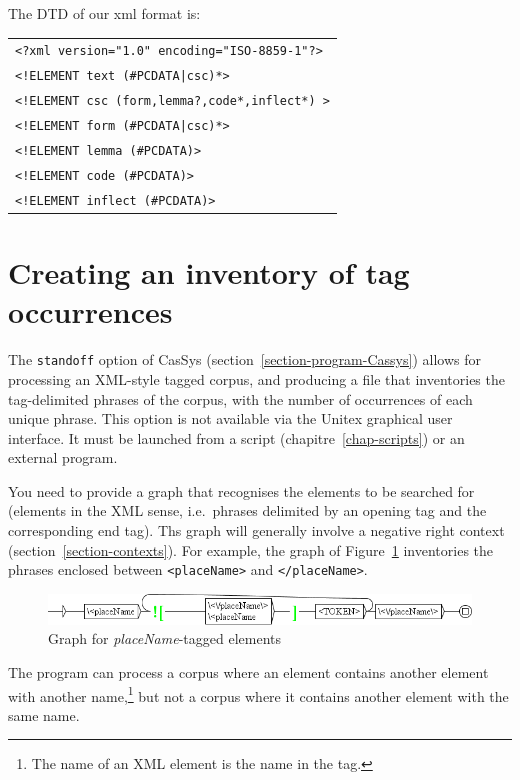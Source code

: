 The DTD of our xml format is:

\begin{tabular}{l}
\texttt{<?xml version="1.0" encoding="ISO-8859-1"?>}\\
\texttt{<!ELEMENT text (\#PCDATA|csc)*>}\\
\texttt{<!ELEMENT csc (form,lemma?,code*,inflect*) >}\\
\texttt{<!ELEMENT form (\#PCDATA|csc)*>}\\
\texttt{<!ELEMENT lemma (\#PCDATA)>}\\
\texttt{<!ELEMENT code (\#PCDATA)>}\\
\texttt{<!ELEMENT inflect (\#PCDATA)>}\\
\end{tabular}

\section{Creating an inventory of tag occurrences}
\label{section-standOff}
The \verb$standoff$ option of CasSys (section~\ref{section-program-Cassys}) allows for processing
an XML-style tagged corpus, and producing a file that inventories the tag-delimited phrases of the 
corpus, with the number of occurrences of each unique phrase.
This option is not available via the Unitex graphical user interface. It must be launched from a script
(chapitre~\ref{chap-scripts}) or an external program.

\bigskip
\noindent You need to provide a graph that recognises the elements to be searched for (elements
in the XML sense, i.e.\ phrases delimited by an opening tag and the corresponding end tag).
Ths graph will generally involve a negative right context (section~\ref{section-contexts}). 
For example, the graph of Figure~\ref{fig-placeNameStandoff} inventories the phrases
enclosed between \verb$<placeName>$ and \verb$</placeName>$.

\begin{figure}[!htb]
  \centering
  \includegraphics[width=15cm]{resources/img/placeNameStandoff.png}
  \caption{Graph for \emph{placeName}-tagged elements}
  \label{fig-placeNameStandoff}
\end{figure}

\noindent The program can process a corpus where an element contains another element with another
name,\footnote{The name of an XML element is the name in the tag.} but not a corpus where it contains another
element with the same name. 

